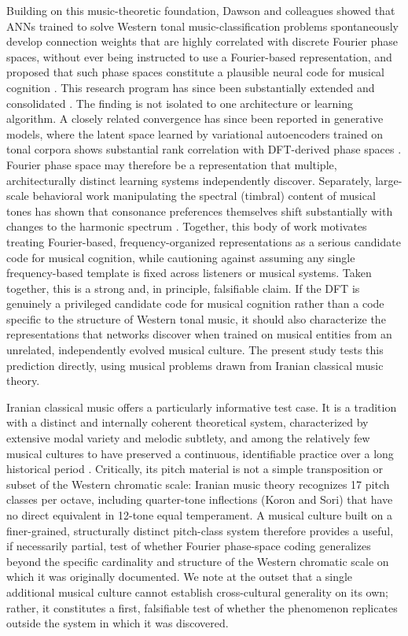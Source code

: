 \documentclass[pdflatex,sn-nature]{sn-jnl}
\begin{document}
Building on this music-theoretic foundation, Dawson and colleagues showed that ANNs
trained to solve Western tonal music-classification problems spontaneously develop
connection weights that are highly correlated with discrete Fourier phase spaces, without
ever being instructed to use a Fourier-based representation, and proposed that such phase
spaces constitute a plausible neural code for musical cognition
\cite{dawson2020,perez2023}. This research program has since been substantially extended
and consolidated \cite{perez2025}. The finding is not isolated to one architecture or learning algorithm. A closely related
convergence has since been reported in generative models, where the latent space learned by
variational autoencoders trained on tonal corpora shows substantial rank correlation with
DFT-derived phase spaces \cite{rodrigues2024}. Fourier phase space may therefore be a
representation that multiple, architecturally distinct learning systems independently
discover. Separately,
large-scale behavioral work manipulating the spectral (timbral) content of musical tones
has shown that consonance preferences themselves shift substantially with changes to the
harmonic spectrum \cite{marjieh2024}. Together, this body of work motivates treating
Fourier-based, frequency-organized representations as a serious candidate code for musical
cognition, while cautioning against assuming any single frequency-based template is fixed
across listeners or musical systems. Taken together, this is a strong and, in principle, falsifiable claim. If the DFT is
genuinely a privileged candidate code for musical cognition rather than a code specific to
the structure of Western tonal music, it should also characterize the representations that
networks discover when trained on musical entities from an unrelated, independently evolved
musical culture. The present study tests
this prediction directly, using musical problems drawn from Iranian classical music theory.

Iranian classical music offers a particularly informative test case. It is a tradition
with a distinct and internally coherent theoretical system, characterized by extensive
modal variety and melodic subtlety, and among the relatively few musical cultures to have
preserved a continuous, identifiable practice over a long historical period
\cite{farhat1990}. Critically, its pitch material is not a simple transposition or subset
of the Western chromatic scale: Iranian music theory recognizes 17 pitch classes per
octave, including quarter-tone inflections (Koron and Sori) that have no direct equivalent
in 12-tone equal temperament. A musical culture built on a finer-grained, structurally
distinct pitch-class system therefore provides a useful, if necessarily partial, test of
whether Fourier phase-space coding generalizes beyond the specific cardinality and
structure of the Western chromatic scale on which it was originally documented. We note at
the outset that a single additional musical culture cannot establish cross-cultural
generality on its own; rather, it constitutes a first, falsifiable test of whether the
phenomenon replicates outside the system in which it was discovered.
\end{document}
